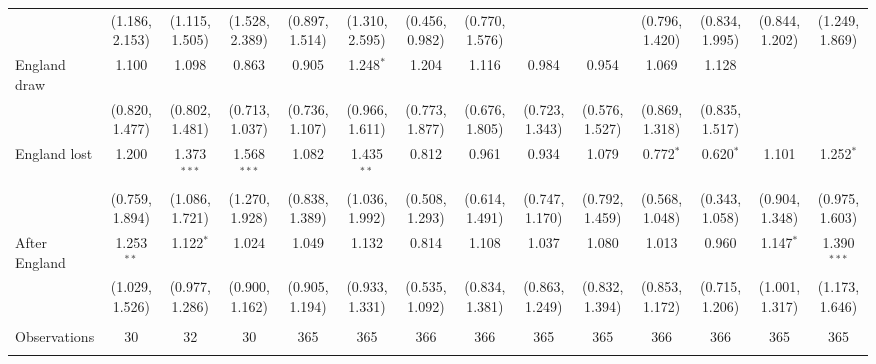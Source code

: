 \documentclass[12pt, a4paper]{article}
\begin{document}
\begin{table}
{\begin{threeparttable}
\begin{tabular}{@{\extracolsep{1pt}}lccccccccccccc}
  & (1.186, 2.153) & (1.115, 1.505) & (1.528, 2.389) & (0.897, 1.514) & (1.310, 2.595) & (0.456, 0.982) & (0.770, 1.576) &  &  & (0.796, 1.420) & (0.834, 1.995) & (0.844, 1.202) & (1.249, 1.869) \\ 
 England draw & 1.100 & 1.098 & 0.863 & 0.905 & 1.248$^{*}$ & 1.204 & 1.116 & 0.984 & 0.954 & 1.069 & 1.128 &  &  \\ 
  & (0.820, 1.477) & (0.802, 1.481) & (0.713, 1.037) & (0.736, 1.107) & (0.966, 1.611) & (0.773, 1.877) & (0.676, 1.805) & (0.723, 1.343) & (0.576, 1.527) & (0.869, 1.318) & (0.835, 1.517) &  &  \\ 
 England lost & 1.200 & 1.373$^{***}$ & 1.568$^{***}$ & 1.082 & 1.435$^{**}$ & 0.812 & 0.961 & 0.934 & 1.079 & 0.772$^{*}$ & 0.620$^{*}$ & 1.101 & 1.252$^{*}$ \\ 
  & (0.759, 1.894) & (1.086, 1.721) & (1.270, 1.928) & (0.838, 1.389) & (1.036, 1.992) & (0.508, 1.293) & (0.614, 1.491) & (0.747, 1.170) & (0.792, 1.459) & (0.568, 1.048) & (0.343, 1.058) & (0.904, 1.348) & (0.975, 1.603) \\ 
 After England & 1.253$^{**}$ & 1.122$^{*}$ & 1.024 & 1.049 & 1.132 & 0.814 & 1.108 & 1.037 & 1.080 & 1.013 & 0.960 & 1.147$^{*}$ & 1.390$^{***}$ \\ 
  & (1.029, 1.526) & (0.977, 1.286) & (0.900, 1.162) & (0.905, 1.194) & (0.933, 1.331) & (0.535, 1.092) & (0.834, 1.381) & (0.863, 1.249) & (0.832, 1.394) & (0.853, 1.172) & (0.715, 1.206) & (1.001, 1.317) & (1.173, 1.646) \\ 
 \hline \\[-1.8ex] 
Observations & 30 & 32 & 30 & 365 & 365 & 366 & 366 & 365 & 365 & 366 & 366 & 365 & 365 \\ 
\hline 
\hline \\[-1.8ex] 

\end{tabular}
\end{threeparttable}}
\end{table}
\end{document}
